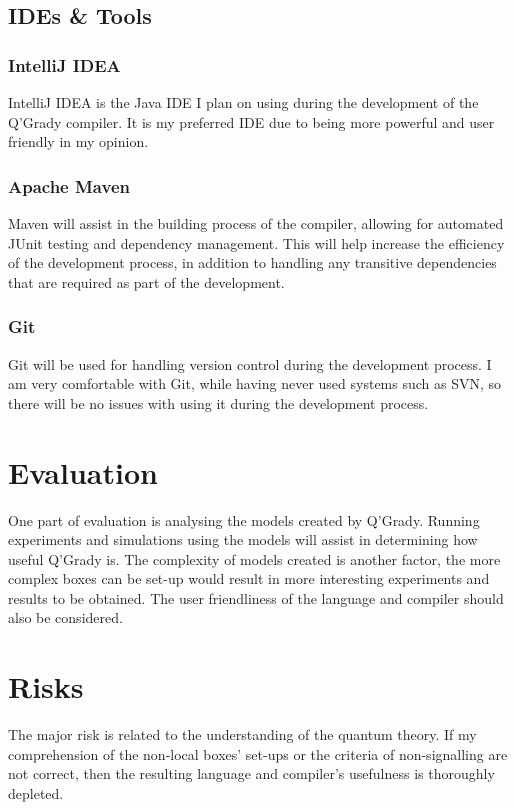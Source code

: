 \documentclass[11pt, a4paper]{article}
\begin{document}
\subsection{IDEs \& Tools} %
\label{sub:ides_tools}
\subsubsection{IntelliJ IDEA} %
IntelliJ IDEA is the Java IDE I plan on using during the development of the
Q'Grady compiler. It is my preferred IDE due to being more powerful and user
friendly in my opinion.
\label{ssub:intellij_idea}
\subsubsection{Apache Maven} %
\label{ssub:apache_maven}
Maven will assist in the building process of the compiler, allowing for 
automated JUnit testing and dependency management. This will help increase the
efficiency of the development process, in addition to handling any transitive
dependencies that are required as part of the development.
\subsubsection{Git} %
\label{ssub:git}
Git will be used for handling version control during the development process. I
am very comfortable with Git, while having never used systems such as SVN, so
there will be no issues with using it during the development process.


\section{Evaluation} %
\label{sec:evaluation}
One part of evaluation is analysing the models created by Q'Grady. Running
experiments and simulations using the models will assist in determining how
useful Q'Grady is. The complexity of models created is another factor, the more
complex boxes can be set-up would result in more interesting experiments and
results to be obtained. The user friendliness of the language and compiler
should also be considered.


\section{Risks} %
\label{sec:risks}
The major risk is related to the understanding of the quantum theory. If my 
comprehension of the non-local boxes' set-ups or the criteria of non-signalling
are not correct, then the resulting language and compiler's usefulness is
thoroughly depleted.
\end{document}
